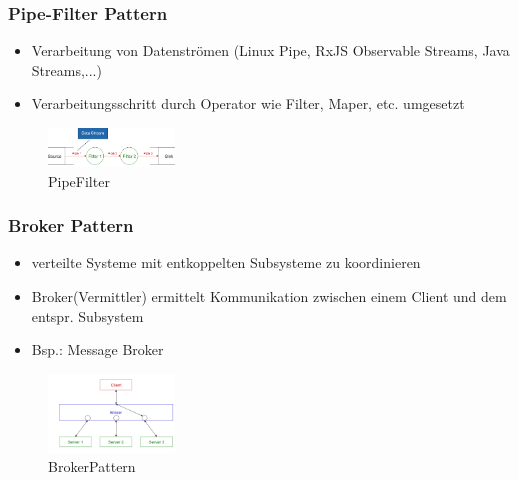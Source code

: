 \documentclass{article}
\begin{document}
\subsubsection{Pipe-Filter Pattern}

\begin{multicols}{2}
	\begin{itemize}
		\item Verarbeitung von Datenströmen (Linux Pipe, RxJS Observable Streams, Java Streams,...)
		\item Verarbeitungsschritt durch Operator wie Filter, Maper, etc. umgesetzt
	\end{itemize}
\columnbreak

\begin{figure}[H]			\includegraphics[width=0.3\textwidth] {Resources/Images/PipeFilter.png}
\caption{\label{fig:PipeFilter}PipeFilter}
\end{figure}

\end{multicols}


\subsubsection{Broker Pattern}
\begin{multicols}{2}
	\begin{itemize}
		\item verteilte Systeme mit entkoppelten Subsysteme zu koordinieren
		\item Broker(Vermittler) ermittelt Kommunikation zwischen einem Client und dem entspr. Subsystem
		\item Bsp.: Message Broker
	\end{itemize}
\columnbreak

\begin{figure}[H]			\includegraphics[width=0.3\textwidth] {Resources/Images/BrokerPattern.png}
\caption{\label{fig:BrokerPattern}BrokerPattern}
\end{figure}

\end{multicols}
\end{document}
